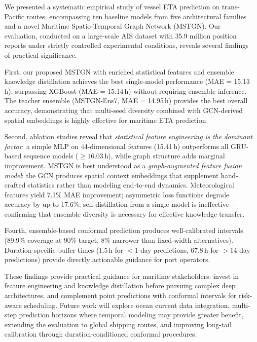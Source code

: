 \documentclass[sigconf,anonymous]{acmart}%
\begin{document}
We presented a systematic empirical study of vessel ETA prediction on trans-Pacific routes, encompassing ten baseline models from five architectural families and a novel Maritime Spatio-Temporal Graph Network (MSTGN).
Our evaluation, conducted on a large-scale AIS dataset with 35.9 million position reports under strictly controlled experimental conditions, reveals several findings of practical significance.

First, our proposed MSTGN with enriched statistical features and ensemble knowledge distillation achieves the best single-model performance (MAE = 15.13\,h), surpassing XGBoost (MAE = 15.14\,h) without requiring ensemble inference.
The teacher ensemble (MSTGN-Ens7, MAE = 14.95\,h) provides the best overall accuracy, demonstrating that multi-seed diversity combined with GCN-derived spatial embeddings is highly effective for maritime ETA prediction.

Second, ablation studies reveal that \textit{statistical feature engineering is the dominant factor}: a simple MLP on 44-dimensional features (15.41\,h) outperforms all GRU-based sequence models (${\geq}16.03$\,h), while graph structure adds marginal improvement. MSTGN is best understood as a \textit{graph-augmented feature fusion model}: the GCN produces spatial context embeddings that supplement hand-crafted statistics rather than modeling end-to-end dynamics. Meteorological features yield 7.1\% MAE improvement; asymmetric loss functions degrade accuracy by up to 17.6\%; self-distillation from a single model is ineffective---confirming that ensemble diversity is necessary for effective knowledge transfer.

Fourth, ensemble-based conformal prediction produces well-calibrated intervals (89.9\% coverage at 90\% target, 8\% narrower than fixed-width alternatives). Duration-specific buffer times (1.5\,h for $<$1-day predictions, 67.8\,h for $>$14-day predictions) provide directly actionable guidance for port operators.

These findings provide practical guidance for maritime stakeholders: invest in feature engineering and knowledge distillation before pursuing complex deep architectures, and complement point predictions with conformal intervals for risk-aware scheduling.
Future work will explore ocean current data integration, multi-step prediction horizons where temporal modeling may provide greater benefit, extending the evaluation to global shipping routes, and improving long-tail calibration through duration-conditioned conformal procedures.
\end{document}
